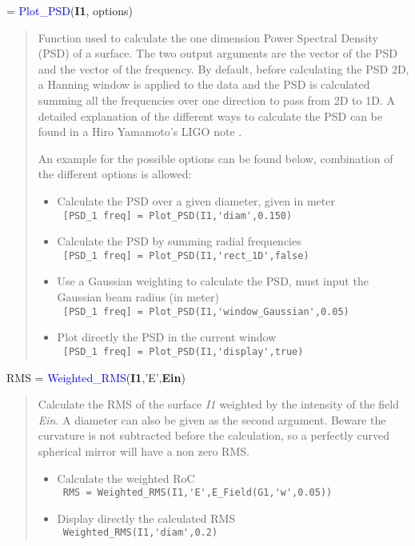 \noindent {} = \textcolor{blue}{Plot\_PSD}(\textbf{I1}, options)
\vspace*{-0.2cm}
\begin{quote}
Function used to calculate the one dimension Power Spectral Density (PSD) of a surface. The two output arguments are the vector of the PSD and the vector of the frequency. By default, before calculating the PSD 2D, a Hanning window is applied to the data and the PSD is calculated summing all the frequencies over one direction to pass from 2D to 1D. A detailed explanation of the different ways to calculate the PSD can be found in a Hiro Yamamoto's LIGO note \cite{Hiro_PSD}.

An example for the possible options can be found below, combination of the different options is allowed:
\begin{itemize}
  \item Calculate the PSD over a given diameter, given in meter \\
        \verb? [PSD_1 freq] = Plot_PSD(I1,'diam',0.150) ?
  \item Calculate the PSD by summing radial frequencies \\
        \verb? [PSD_1 freq] = Plot_PSD(I1,'rect_1D',false) ?
  \item Use a Gaussian weighting to calculate the PSD, must input the Gaussian beam radius (in meter) \\
        \verb? [PSD_1 freq] = Plot_PSD(I1,'window_Gaussian',0.05) ?
  \item Plot directly the PSD in the current window \\
        \verb? [PSD_1 freq] = Plot_PSD(I1,'display',true) ?
\end{itemize}
\end{quote}


\noindent RMS = \textcolor{blue}{Weighted\_RMS}(\textbf{I1},'E',\textbf{Ein})
\vspace*{-0.2cm}
\begin{quote}
Calculate the RMS of the surface \textsl{I1} weighted by the intensity of the field \textsl{Ein}. A diameter can also be given as the second argument. Beware the curvature is not subtracted before the calculation, so a perfectly curved spherical mirror will have a non zero RMS.
\begin{itemize}
  \item Calculate the weighted RoC \\
        \verb? RMS = Weighted_RMS(I1,'E',E_Field(G1,'w',0.05)) ?
  \item Display directly the calculated RMS \\
        \verb? Weighted_RMS(I1,'diam',0.2) ?
\end{itemize}
\end{quote}


